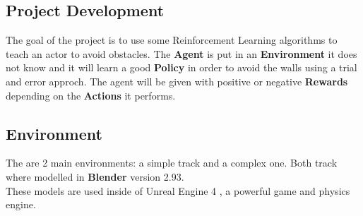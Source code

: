 \documentclass[14pt]{extarticle}
\def\sp{\vspace{5pt}}
\begin{document}
\newpage
\begin{center}
	\section{Project Development}
	\sp
\end{center}
\begin{flushleft}
	The goal of the project is to use some Reinforcement Learning algorithms to teach an actor to avoid obstacles. The \textbf{Agent} is put in an \textbf{Environment} it does not know and it will learn a good \textbf{Policy} in order to avoid the walls using a trial and error approch. The agent will be given with positive or negative \textbf{Rewards} depending on the \textbf{Actions} it performs. 
	
	\subsection{Environment}
	\sp
	The are 2 main environments: a simple track and a complex one. Both track where modelled in \textbf{Blender} version 2.93\cite{Blender}. \\
	These models are used inside of Unreal Engine 4 \cite{UE4}, a powerful game and physics engine.
	

\end{flushleft}
\end{document}
